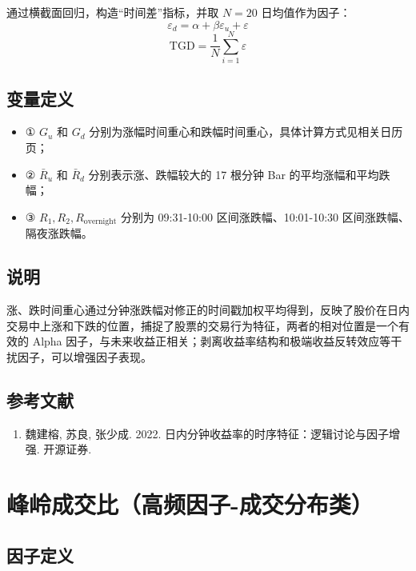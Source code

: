 \documentclass{article}
\begin{document}
通过横截面回归，构造“时间差”指标，并取 \( N=20 \) 日均值作为因子：
\begin{equation}
    \varepsilon_d = \alpha + \beta \varepsilon_u + \varepsilon
\end{equation}
\begin{equation}
    \mathrm{TGD} = \frac{1}{N} \sum_{i=1}^N \varepsilon
\end{equation}

\subsection{变量定义}
\begin{itemize}
    \item ① \( G_u \) 和 \( G_d \) 分别为涨幅时间重心和跌幅时间重心，具体计算方式见相关日历页；
    \item ② \( \bar{R}_u \) 和 \( \bar{R}_d \) 分别表示涨、跌幅较大的 17 根分钟 Bar 的平均涨幅和平均跌幅；
    \item ③ \( R_1, R_2, R_{\mathrm{overnight}} \) 分别为 09:31-10:00 区间涨跌幅、10:01-10:30 区间涨跌幅、隔夜涨跌幅。
\end{itemize}

\subsection{说明}
涨、跌时间重心通过分钟涨跌幅对修正的时间戳加权平均得到，反映了股价在日内交易中上涨和下跌的位置，捕捉了股票的交易行为特征，两者的相对位置是一个有效的 Alpha 因子，与未来收益正相关；剥离收益率结构和极端收益反转效应等干扰因子，可以增强因子表现。

\subsection{参考文献}
\begin{enumerate}
    \item 魏建榕, 苏良, 张少成. 2022. 日内分钟收益率的时序特征：逻辑讨论与因子增强. 开源证券.
\end{enumerate}

\section{峰岭成交比（高频因子-成交分布类）}

\subsection{因子定义}
\end{document}
